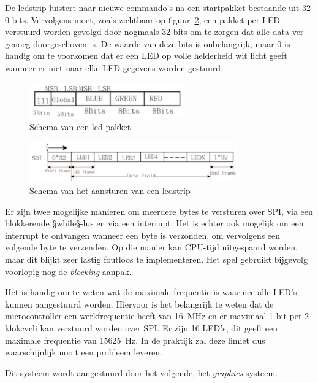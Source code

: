 \documentclass[12pt]{ugentreport}
\begin{document}
De ledstrip luistert naar nieuwe commando's na een startpakket
bestaande uit 32 0-bits. Vervolgens moet,
zoals zichtbaar op figuur~\ref{fig:ledcontrol},
een pakket per LED verstuurd worden gevolgd door
nogmaals 32 bits om te zorgen dat alle data ver genoeg doorgeschoven is.
De waarde van deze bits is onbelangrijk,
maar 0 is handig om te voorkomen dat er een LED op volle helderheid wit licht
geeft wanneer er niet naar elke LED gegevens worden gestuurd.

\begin{figure}
  \centering
  \includegraphics[width=0.6\textwidth]{img/ledpakket.png}
  \caption{Schema van een led-pakket}
  \label{fig:ledpakket}
\end{figure}

\begin{figure}
  \centering
  \includegraphics[width=0.8\textwidth]{img/ledcontrol.png}
  \caption{Schema van het aansturen van een ledstrip}
  \label{fig:ledcontrol}
\end{figure}

Er zijn twee mogelijke manieren om meerdere bytes te versturen over SPI,
via een blokkerende §while§-lus en via een interrupt.
Het is echter ook mogelijk om een interrupt te ontvangen wanneer een byte is
verzonden,
om vervolgens een volgende byte te verzenden. Op die manier kan CPU-tijd
uitgespaard worden, maar dit blijkt zeer lastig foutloos te implementeren.
Het spel gebruikt bijgevolg voorlopig nog de \emph{blocking} aanpak.

Het is handig om te weten wat de maximale frequentie is waarmee alle LED's
kunnen aangestuurd worden.
Hiervoor is het belangrijk te weten dat de microcontroller
een werkfrequentie heeft van \SI{16}{\mega\hertz}
en er maximaal 1 bit per 2 klokcycli kan verstuurd worden over SPI.
Er zijn 16 LED's, dit geeft een maximale frequentie van \SI{15625}{\hertz}.
In de praktijk zal deze limiet dus waarschijnlijk nooit een probleem leveren.

Dit systeem wordt aangestuurd door het volgende, het \emph{graphics} systeem.
\end{document}
